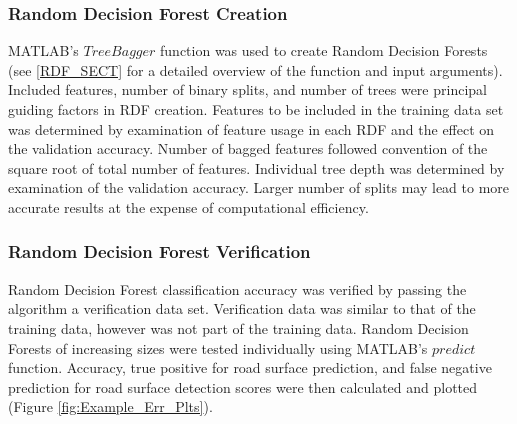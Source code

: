 \documentclass[numbered,pdftex]{ohio-etd}
\begin{document}
{{{{			} %
			
			\subsubsection{Random Decision Forest Creation}\label{sec:random-decision-forest-creation}{
			
				{MATLAB's $TreeBagger$ function was used to create Random Decision Forests (see \ref{RDF_SECT} for a detailed overview of the function and input arguments). Included features, number of binary splits, and number of trees were principal guiding factors in RDF creation. Features to be included in the training data set was determined by examination of feature usage in each RDF and the effect on the validation accuracy. Number of bagged features followed convention of the square root of total number of features. Individual tree depth was determined by examination of the validation accuracy. Larger number of splits may lead to more accurate results at the expense of computational efficiency. } 

				
%				

				
			} %

	
			\subsubsection{Random Decision Forest Verification}\label{sec:random-decision-forest-verification}{
			
				{Random Decision Forest classification accuracy was verified by passing the algorithm a verification data set. Verification data was similar to that of the training data, however was not part of the training data. Random Decision Forests of increasing sizes were tested individually using MATLAB's $predict$ function. Accuracy, true positive for road surface prediction, and false negative prediction for road surface detection scores were then calculated and plotted (Figure \ref{fig:Example_Err_Plts}).}

				\begin{figure}[H]
					
					

\end{figure}}}}}
\end{document}
